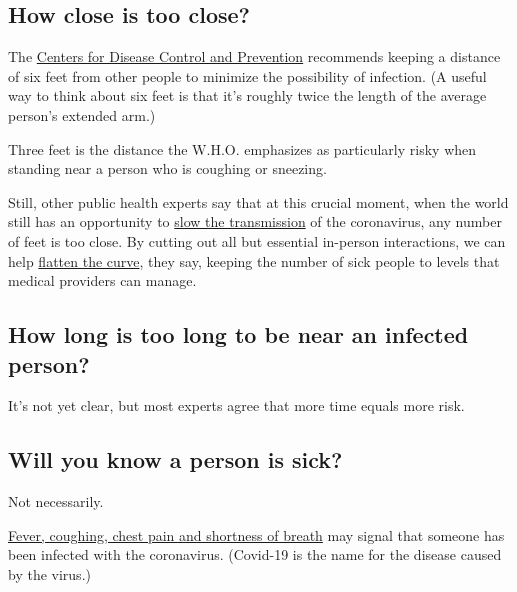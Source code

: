 \hypertarget{how-close-is-too-close}{%
\subsection{How close is too close?}\label{how-close-is-too-close}}

The
\href{https://www.cdc.gov/coronavirus/2019-ncov/hcp/clinical-criteria.html}{Centers
for Disease Control and Prevention} recommends keeping a distance of six
feet from other people to minimize the possibility of infection. (A
useful way to think about six feet is that it's roughly twice the length
of the average person's extended arm.)

Three feet is the distance the W.H.O. emphasizes as particularly risky
when standing near a person who is coughing or sneezing.

Still, other public health experts say that at this crucial moment, when
the world still has an opportunity to
\href{https://www.nytimes3xbfgragh.onion/interactive/2020/03/19/world/coronavirus-flatten-the-curve-countries.html}{slow
the transmission} of the coronavirus, any number of feet is too close.
By cutting out all but essential in-person interactions, we can help
\href{https://www.nytimes3xbfgragh.onion/2020/03/11/science/coronavirus-curve-mitigation-infection.html}{flatten
the curve}, they say, keeping the number of sick people to levels that
medical providers can manage.

\hypertarget{how-long-is-too-long-to-be-near-an-infected-person}{%
\subsection{How long is too long to be near an infected
person?}\label{how-long-is-too-long-to-be-near-an-infected-person}}

It's not yet clear, but most experts agree that more time equals more
risk.

\hypertarget{will-you-know-a-person-is-sick}{%
\subsection{Will you know a person is
sick?}\label{will-you-know-a-person-is-sick}}

Not necessarily.

\href{https://www.nytimes3xbfgragh.onion/article/coronavirus-body-symptoms.html}{Fever,
coughing, chest pain and shortness of breath} may signal that someone
has been infected with the coronavirus. (Covid-19 is the name for the
disease caused by the virus.)

